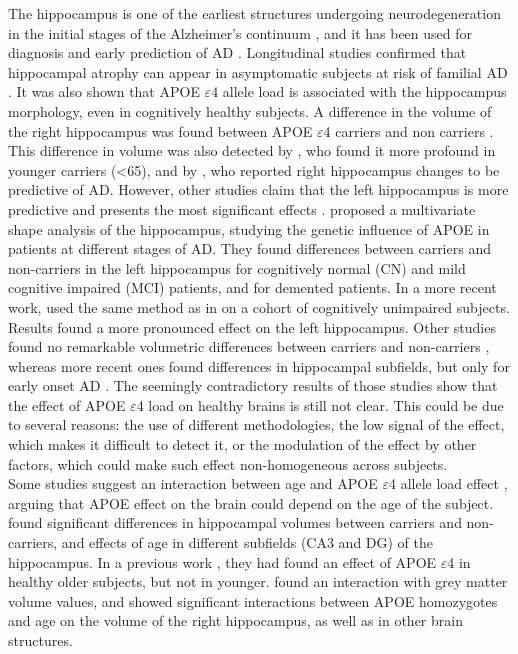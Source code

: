 The hippocampus is one of the earliest structures undergoing neurodegeneration in the initial stages of the Alzheimer's continuum \cite{Pievani2011}, and it has been used for diagnosis and early prediction of AD \cite{Sanroma2017}. Longitudinal studies confirmed that hippocampal atrophy can appear in asymptomatic subjects at risk of familial AD \cite{Fox1996}. It was also shown that APOE $\varepsilon$4 allele load is associated with the hippocampus morphology, even in cognitively healthy subjects. A difference in the volume of the right hippocampus was found between APOE $\varepsilon$4 carriers and non carriers \cite{ODwyer2012}. This difference in volume was also detected by \cite{Lind2006}, who found it more profound in younger carriers (<65), and by \cite{Tondelli2012}, who reported right hippocampus changes to be predictive of AD. However, other studies claim that the left hippocampus is more predictive and presents the most significant effects \cite{Csernansky2005}. \cite{Shi2014} proposed a multivariate shape analysis of the hippocampus, studying the genetic influence of APOE in patients at different stages of AD. They found differences between carriers and non-carriers in the left hippocampus for cognitively normal (CN) and mild cognitive impaired (MCI) patients, and for demented patients. In a more recent work, \cite{Dong2019} used the same method as in \cite{Shi2014} on a cohort of cognitively unimpaired subjects. Results found a more pronounced effect on the left hippocampus. Other studies found no remarkable volumetric differences between carriers and non-carriers \cite{Hostage2013,Protas2013}, whereas more recent ones found differences in hippocampal subfields, but only for early onset AD \cite{Parker2019}. The seemingly contradictory results of those studies show that the effect of APOE $\varepsilon$4 load on healthy brains is still not clear. This could be due to several reasons: the use of different methodologies, the low signal of the effect, which makes it difficult to detect it, or the modulation of the effect by other factors, which could make such effect non-homogeneous across subjects. \\

Some studies suggest an interaction between age and APOE $\varepsilon$4 allele load effect \cite{Tuminello2011}, arguing that APOE effect on the brain could depend on the age of the subject. \cite{Mueller2009} found significant differences in hippocampal volumes between carriers and non-carriers, and effects of age in different subfields (CA3 and DG) of the hippocampus. In a previous work \cite{Mueller2008}, they had found an effect of APOE $\varepsilon$4 in healthy older subjects, but not in younger. \cite{TenKate2016} found an interaction with grey matter volume values, and \cite{Cacciaglia2018} showed significant interactions between APOE homozygotes and age on the volume of the right hippocampus, as well as in other brain structures. \\

